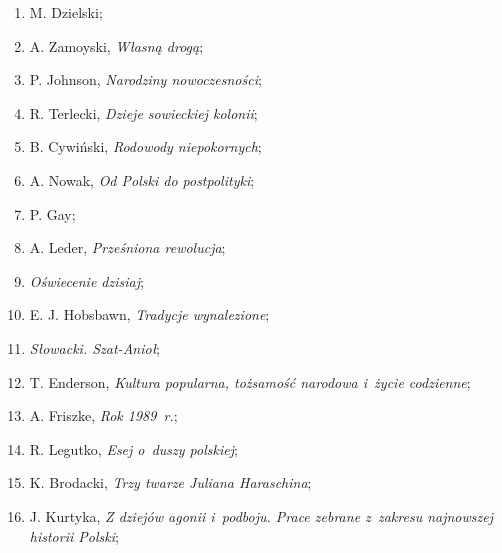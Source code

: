 \documentclass[a4paper,11pt]{article}
\begin{document}
\begin{enumerate}
\item M. Dzielski;



\item A. Zamoyski, \textit{Własną drogą};



\item P. Johnson, \textit{Narodziny nowoczesności};



\item R. Terlecki, \textit{Dzieje sowieckiej kolonii};



\item B. Cywiński, \textit{Rodowody niepokornych};



\item A. Nowak, \textit{Od Polski do postpolityki};



\item P. Gay;



\item A. Leder, \textit{Prześniona rewolucja};



\item \textit{Oświecenie dzisiaj};



\item E. J. Hobsbawn, \textit{Tradycje wynalezione};



\item \textit{Słowacki. Szat-Anioł};



\item T. Enderson, \textit{Kultura popularna, tożsamość narodowa i~życie
    codzienne};



\item A. Friszke, \textit{Rok 1989~r.};



\item R. Legutko, \textit{Esej o~duszy polskiej};



\item K. Brodacki, \textit{Trzy twarze Juliana Haraschina};



\item J. Kurtyka, \textit{Z dziejów agonii i~podboju. Prace zebrane
    z~zakresu najnowszej historii Polski};




\end{enumerate}
\end{document}

